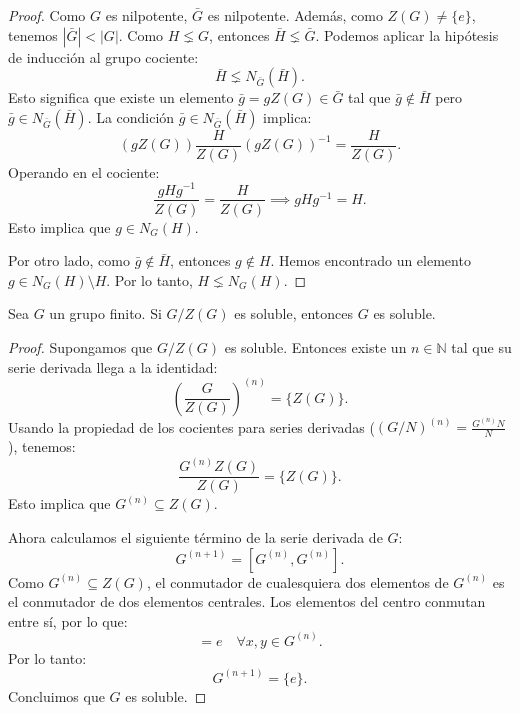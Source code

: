\begin{proof}
    Como $G$ es nilpotente, $\bar{G}$ es nilpotente. Además, como $Z(G) \neq \{e\}$, tenemos $|\bar{G}| < |G|$.
    Como $H \lneq G$, entonces $\bar{H} \lneq \bar{G}$.
    Podemos aplicar la hipótesis de inducción al grupo cociente:
    \begin{equation*}
        \bar{H} \lneq N_{\bar{G}}(\bar{H}).
    \end{equation*}
    Esto significa que existe un elemento $\bar{g} = gZ(G) \in \bar{G}$ tal que $\bar{g} \notin \bar{H}$ pero $\bar{g} \in N_{\bar{G}}(\bar{H})$.
    La condición $\bar{g} \in N_{\bar{G}}(\bar{H})$ implica:
    \begin{equation*}
        (gZ(G)) \frac{H}{Z(G)} (gZ(G))^{-1} = \frac{H}{Z(G)}.
    \end{equation*}
    Operando en el cociente:
    \begin{equation*}
        \frac{gHg^{-1}}{Z(G)} = \frac{H}{Z(G)} \implies gHg^{-1} = H.
    \end{equation*}
    Esto implica que $g \in N_G(H)$.
    
    Por otro lado, como $\bar{g} \notin \bar{H}$, entonces $g \notin H$.
    Hemos encontrado un elemento $g \in N_G(H) \setminus H$.
    Por lo tanto, $H \lneq N_G(H)$.
\end{proof}


\begin{prop}
    Sea $G$ un grupo finito. Si $G/Z(G)$ es soluble, entonces $G$ es soluble.
\end{prop}

\begin{proof}
    Supongamos que $G/Z(G)$ es soluble. Entonces existe un $n \in \mathbb{N}$ tal que su serie derivada llega a la identidad:
    \begin{equation*}
        \left(\frac{G}{Z(G)}\right)^{(n)} = \{Z(G)\}.
    \end{equation*}
    Usando la propiedad de los cocientes para series derivadas ($(G/N)^{(n)} = \frac{G^{(n)}N}{N}$), tenemos:
    \begin{equation*}
        \frac{G^{(n)}Z(G)}{Z(G)} = \{Z(G)\}.
    \end{equation*}
    Esto implica que $G^{(n)} \subseteq Z(G)$.
    
    Ahora calculamos el siguiente término de la serie derivada de $G$:
    \begin{equation*}
        G^{(n+1)} = [G^{(n)}, G^{(n)}].
    \end{equation*}
    Como $G^{(n)} \subseteq Z(G)$, el conmutador de cualesquiera dos elementos de $G^{(n)}$ es el conmutador de dos elementos centrales. Los elementos del centro conmutan entre sí, por lo que:
    \begin{equation*}
        [x, y] = e \quad \forall x, y \in G^{(n)}.
    \end{equation*}
    Por lo tanto:
    \begin{equation*}
        G^{(n+1)} = \{e\}.
    \end{equation*}
    Concluimos que $G$ es soluble.
\end{proof}

